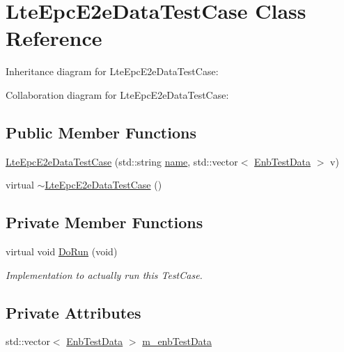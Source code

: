 \hypertarget{classLteEpcE2eDataTestCase}{}\section{Lte\+Epc\+E2e\+Data\+Test\+Case Class Reference}
\label{classLteEpcE2eDataTestCase}


Inheritance diagram for Lte\+Epc\+E2e\+Data\+Test\+Case\+:


Collaboration diagram for Lte\+Epc\+E2e\+Data\+Test\+Case\+:
\subsection*{Public Member Functions}
\begin{DoxyCompactItemize}
\item 
\hyperlink{classLteEpcE2eDataTestCase_a2a9cb5a774a5382fcff2e7c54346cc34}{Lte\+Epc\+E2e\+Data\+Test\+Case} (std\+::string \hyperlink{generate__test__data__lte__spectrum__model_8m_ab74e6bf80237ddc4109968cedc58c151}{name}, std\+::vector$<$ \hyperlink{structEnbTestData}{Enb\+Test\+Data} $>$ v)
\item 
virtual \hyperlink{classLteEpcE2eDataTestCase_af614f2e0f284b1489de33103f0f51112}{$\sim$\+Lte\+Epc\+E2e\+Data\+Test\+Case} ()
\end{DoxyCompactItemize}
\subsection*{Private Member Functions}
\begin{DoxyCompactItemize}
\item 
virtual void \hyperlink{classLteEpcE2eDataTestCase_a7b55bb639cd07d8b68365444a4cea639}{Do\+Run} (void)
\begin{DoxyCompactList}\small\item\em Implementation to actually run this Test\+Case. \end{DoxyCompactList}\end{DoxyCompactItemize}
\subsection*{Private Attributes}
\begin{DoxyCompactItemize}
\item 
std\+::vector$<$ \hyperlink{structEnbTestData}{Enb\+Test\+Data} $>$ \hyperlink{classLteEpcE2eDataTestCase_aa2d95eb5a8d25e0d6caa7dbdbe77a85e}{m\+\_\+enb\+Test\+Data}
\end{DoxyCompactItemize}

